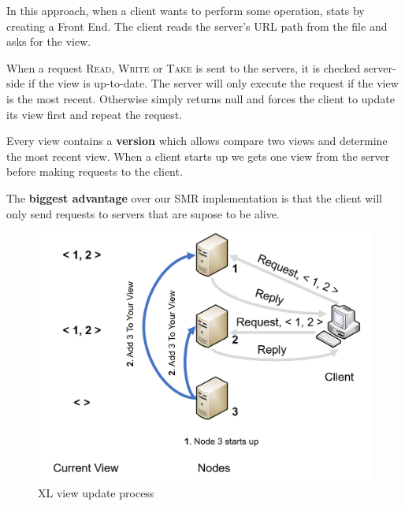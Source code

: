 \documentclass[times, 10pt,twocolumn]{article}
\begin{document}


In this approach, when a client wants to perform some operation, stats by creating
a Front End. The client reads the server's URL path from the file and asks for
the view.

When a request \textsc{Read}, \textsc{Write} or \textsc{Take} is sent to the servers,
it is checked server-side if the view is up-to-date.
The server will only execute the request if the view is the most recent. Otherwise
simply returns null and forces the client to update its view first and repeat the
request.

Every view contains a \textbf{version} which allows compare two views and determine the
most recent view. When a client starts up we gets one view from the server before
making requests to the client.

The \textbf{biggest advantage} over our SMR implementation is that the client will only
send requests to servers that are supose to be alive.

 


\begin{figure}
   \includegraphics[width=\linewidth]{xl_join1.png}
   \caption{XL view update process}
   \label{fig:xl_join1}
 \end{figure}
\end{document}
